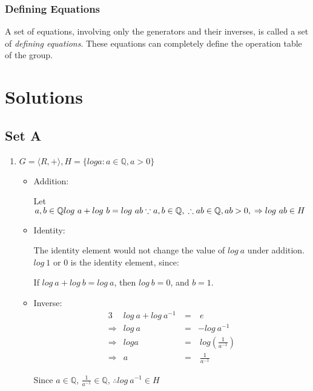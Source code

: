\documentclass[12pt]{article}
\begin{document}
\subsubsection*{Defining Equations}
A set of equations, involving only the generators and their inverses, is called a set of \textit{defining equations}. These equations can completely define the operation table of the group.


\section*{Solutions}
\label{sec:solutions}

\subsection*{Set A}

\begin{enumerate}
\item $G = \langle R, + \rangle, H = \{log a: a \in \mathbb{Q}, a > 0\}$
  \begin{itemize}
    \item 
      Addition:
      
      Let $a, b \in \mathbb{Q} \\
      log\ a + log\ b = log\ ab \\
      \because a, b \in \mathbb{Q},\\
      \therefore ab \in \mathbb{Q}, ab > 0, \\
      \Rightarrow log\ ab \in H$
    \item 
      Identity:
      
      The identity element would not change the value of $log\ a$ under addition. 
      $log\ 1$ or $0$ is the identity element, since:

      If $log\ a + log\ b = log\ a$, then $log\ b = 0$, and $b = 1$.


    \item 
      Inverse:
        \begin{alignat*}{3}
          &log\ a + log\ a^{-1} \ &= &\ e \\ 
          \Rightarrow & log\ a &= & -log\ a^{-1} \\
          \Rightarrow & log a   &= &\ log(\frac{1}{a^{-1}}) \\
          \Rightarrow & a      &= &\ \frac{1}{a^{-1}}
        \end{alignat*}
      
      Since $a \in \mathbb{Q}$, $\frac{1}{a^{-1}} \in \mathbb{Q}$, $\therefore log\ a^{-1} \in H$
       
    \end{itemize}

  \end{enumerate}
\end{document}
